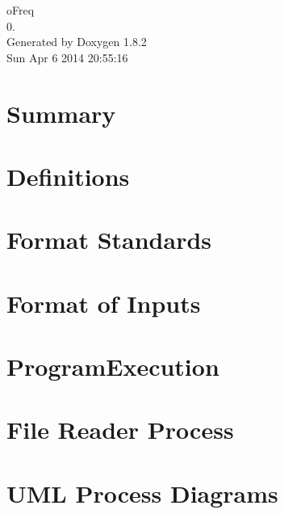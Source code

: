 \documentclass{book}
\begin{document}
\hypersetup{pageanchor=false,citecolor=blue}
\begin{titlepage}
\vspace*{7cm}
\begin{center}
{\Large o\-Freq \\[1ex]\large 0. }\\
\vspace*{1cm}
{\large Generated by Doxygen 1.8.2}\\
\vspace*{0.5cm}
{\small Sun Apr 6 2014 20:55:16}\\
\end{center}
\end{titlepage}
\clearemptydoublepage
{}
\tableofcontents
\clearemptydoublepage
{}
\hypersetup{pageanchor=true,citecolor=blue}
\chapter{Summary}
\label{index}\hypertarget{index}{}
\chapter{Definitions}
\label{definitions}
\hypertarget{definitions}{}

\chapter{Format Standards}
\label{Coding}
\hypertarget{Coding}{}

\chapter{Format of Inputs}
\label{InputFormatting}
\hypertarget{InputFormatting}{}

\chapter{Program\-Execution}
\label{ProgramExecution}
\hypertarget{ProgramExecution}{}

\chapter{File Reader Process}
\label{UML_FileReader}
\hypertarget{UML_FileReader}{}

\chapter{U\-M\-L Process Diagrams}
\label{UML_Process}
\hypertarget{UML_Process}{}

\end{document}
